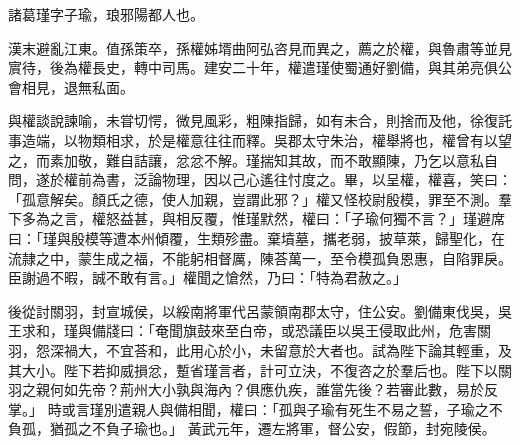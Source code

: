 \begin{pinyinscope}
 
 
 諸葛瑾字子瑜，琅邪陽都人也。
 
 
 漢末避亂江東。值孫策卒，孫權姊壻曲阿弘咨見而異之，薦之於權，與魯肅等並見賔待，後為權長史，轉中司馬。建安二十年，權遣瑾使蜀通好劉備，與其弟亮俱公會相見，退無私面。
 
 
 
 
 與權談說諫喻，未甞切愕，微見風彩，粗陳指歸，如有未合，則捨而及他，徐復託事造端，以物類相求，於是權意往往而釋。吳郡太守朱治，權舉將也，權曾有以望之，而素加敬，難自詰讓，忿忿不解。瑾揣知其故，而不敢顯陳，乃乞以意私自問，遂於權前為書，泛論物理，因以己心遙往忖度之。畢，以呈權，權喜，笑曰：「孤意解矣。顏氏之德，使人加親，豈謂此邪？」權又怪校尉殷模，罪至不測。羣下多為之言，權怒益甚，與相反覆，惟瑾默然，權曰：「子瑜何獨不言？」瑾避席曰：「瑾與殷模等遭本州傾覆，生類殄盡。棄墳墓，攜老弱，披草萊，歸聖化，在流隷之中，蒙生成之福，不能躬相督厲，陳荅萬一，至令模孤負恩惠，自陷罪戾。臣謝過不暇，誠不敢有言。」權聞之愴然，乃曰：「特為君赦之。」
 
 
後從討關羽，封宣城侯，以綏南將軍代呂蒙領南郡太守，住公安。劉備東伐吳，吳王求和，瑾與備牋曰：「奄聞旗鼓來至白帝，或恐議臣以吳王侵取此州，危害關羽，怨深禍大，不宜荅和，此用心於小，未留意於大者也。試為陛下論其輕重，及其大小。陛下若抑威損忿，蹔省瑾言者，計可立決，不復咨之於羣后也。陛下以關羽之親何如先帝？荊州大小孰與海內？俱應仇疾，誰當先後？若審此數，易於反掌。」
 時或言瑾別遣親人與備相聞，權曰：「孤與子瑜有死生不易之誓，子瑜之不負孤，猶孤之不負子瑜也。」
 黃武元年，遷左將軍，督公安，假節，封宛陵侯。
 

\end{pinyinscope}
